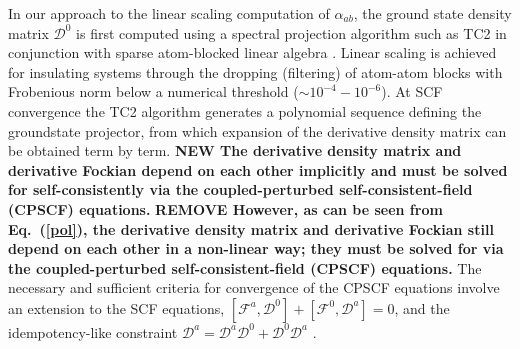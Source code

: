\documentclass[prl,aps,twocolumn,showpacs,twocolumngrid,superbib]{revtex4}
\begin{document}
In our approach to the linear scaling computation of $\alpha_{ab}$, the ground state 
density matrix $\mathcal{D}^0$ is first computed using a spectral projection algorithm such 
as TC2 \cite{} in conjunction with sparse atom-blocked linear algebra \cite{}.  
Linear scaling is achieved for insulating systems through the dropping (filtering) of atom-atom 
blocks with Frobenious norm below a numerical threshold ($\sim 10^{-4}-10^{-6}$).
At SCF convergence the TC2 algorithm generates a polynomial sequence defining the groundstate projector, 
from which expansion of the derivative density matrix can be obtained term by term.
{\bf NEW The derivative density matrix and derivative Fockian depend on each other implicitly
and must be solved for self-consistently via the coupled-perturbed 
self-consistent-field (CPSCF) equations.}
{\bf REMOVE However, as can be seen from Eq.~(\ref{pol}), the derivative density
 matrix and derivative Fockian still depend 
on each other in a non-linear way; they must be solved for via the coupled-perturbed 
self-consistent-field (CPSCF) equations.}
The necessary and sufficient 
criteria for convergence of the CPSCF equations involve an extension to the SCF equations, 
$[\mathcal{F}^{a},\mathcal{D}^{0}]+[\mathcal{F}^{0},\mathcal{D}^{a}]=0$,
and the idempotency-like constraint
$\mathcal{D}^{a}=\mathcal{D}^{a} \mathcal{D}^{0}+\mathcal{D}^{0} \mathcal{D}^{a}$ \cite{Furche_2001}.
\end{document}
